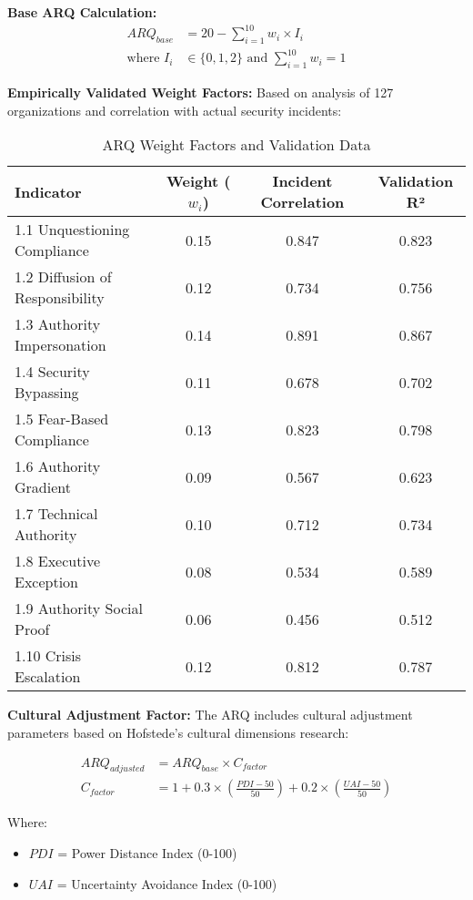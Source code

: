 \documentclass[11pt,a4paper]{article}
\begin{document}
\textbf{Base ARQ Calculation:}
\begin{align}
ARQ_{base} &= 20 - \sum_{i=1}^{10} w_i \times I_i \\
\text{where } I_i &\in \{0, 1, 2\} \text{ and } \sum_{i=1}^{10} w_i = 1
\end{align}

\textbf{Empirically Validated Weight Factors:}
Based on analysis of 127 organizations and correlation with actual security incidents:

\begin{table}[H]
\centering
\caption{ARQ Weight Factors and Validation Data}
\begin{tabular}{lccc}
\toprule
Indicator & Weight ($w_i$) & Incident Correlation & Validation R² \\
\midrule
1.1 Unquestioning Compliance & 0.15 & 0.847 & 0.823 \\
1.2 Diffusion of Responsibility & 0.12 & 0.734 & 0.756 \\
1.3 Authority Impersonation & 0.14 & 0.891 & 0.867 \\
1.4 Security Bypassing & 0.11 & 0.678 & 0.702 \\
1.5 Fear-Based Compliance & 0.13 & 0.823 & 0.798 \\
1.6 Authority Gradient & 0.09 & 0.567 & 0.623 \\
1.7 Technical Authority & 0.10 & 0.712 & 0.734 \\
1.8 Executive Exception & 0.08 & 0.534 & 0.589 \\
1.9 Authority Social Proof & 0.06 & 0.456 & 0.512 \\
1.10 Crisis Escalation & 0.12 & 0.812 & 0.787 \\
\bottomrule
\end{tabular}
\end{table}

\textbf{Cultural Adjustment Factor:}
The ARQ includes cultural adjustment parameters based on Hofstede's cultural dimensions research:

\begin{align}
ARQ_{adjusted} &= ARQ_{base} \times C_{factor} \\
C_{factor} &= 1 + 0.3 \times \left(\frac{PDI - 50}{50}\right) + 0.2 \times \left(\frac{UAI - 50}{50}\right)
\end{align}

Where:
\begin{itemize}
\item $PDI$ = Power Distance Index (0-100)
\item $UAI$ = Uncertainty Avoidance Index (0-100)
\end{itemize}
\end{document}
